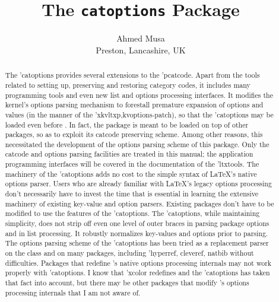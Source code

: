\documentclass[
  use-a4-paper,
  use-10pt-font,
  final-version,
  use-UK-English,
  fancy-section-headings,
  frame-section-numbers,
  para-abstract-style,
  input-config-file,
  no-hyperref-messages
]{amltxdoc}
\begin{document}
\begin{frontmatter}
\title{The \texttt{\color{blue}catoptions} Package}
\author{Ahmed Musa \\Preston, Lancashire, UK}

\def\abstractname{\textsf{Summary}}
\begin{abstract}
  \small
  The \pkg'{catoptions} provides several extensions to the \pkgm'{pcatcode}. Apart from the tools related to setting up, preserving and restoring category codes, it includes many \texorlatex programming tools and even new list and options processing interfaces. It modifies the \latex kernel's options parsing mechanism to forestall premature expansion of options and values (in the manner of the \pkg'{xkvltxp,kvoptions-patch}), so that the \pkg'{catoptions} may be loaded even before \hx{\documentclass}. In fact, the package is meant to be loaded on top of other packages, so as to exploit its catcode preserving scheme. Among other reasons, this necessitated the development of the options parsing scheme of this package. Only the catcode and options parsing facilities are treated in this manual; the application programming interfaces will be covered in the documentation of the \pkg'{ltxtools}. The machinery of the \pkg'{catoptions} adds no cost to the simple syntax of \LaTeX's native options parser. Users who are already familiar with \LaTeX's legacy options processing don't necessarily have to invest the time that is essential in learning the extensive machinery of existing key-value and option parsers. Existing packages don't have to be modified to use the features of the \pkg'{catoptions}. The \pkg'{catoptions}, while maintaining simplicity, does not strip off even one level of outer braces in parsing package options and in list processing. It robustly normalizes key-values and options prior to parsing. The options parsing scheme of the \pkg'{catoptions} has been tried as a replacement parser on the  class and on many packages, including \pkg'{hyperref, cleveref, natbib} without difficulties. Packages that redefine \latex's native options processing internals may not work properly with \pkg'{catoptions}. I know that \pkg'{xcolor} redefines \hx{\@declareoption} and the \pkg'{catoptions} has taken that fact into account, but there may be other packages that modify \latex's options processing internals that I am not aware of.
\end{abstract}


\end{frontmatter}
\end{document}
